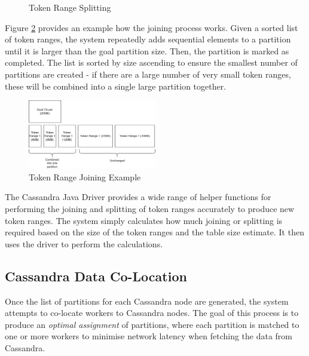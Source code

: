 \begin{figure}[h]
	\centering
	\qquad
	\caption{Token Range Splitting}
	\label{fig:cassandra-split-process}
\end{figure}

Figure \ref{fig:cassandra-join-process} provides an example how the joining process works. Given a sorted list of token ranges, the system repeatedly adds sequential elements to a partition until it is larger than the goal partition size. Then, the partition is marked as completed. The list is sorted by size ascending to ensure the smallest number of partitions are created - if there are a large number of very small token ranges, these will be combined into a single large partition together.

\begin{figure}[h]
	\centering
	\includegraphics[width=0.5\textwidth]{chapters/diagrams/implementation/cassandra-join-example}
	\caption{Token Range Joining Example}
	\label{fig:cassandra-join-process}
\end{figure}

The Cassandra Java Driver provides a wide range of helper functions for performing the joining and splitting of token ranges accurately to produce new token ranges. The system simply calculates how much joining or splitting is required based on the size of the token ranges and the table size estimate. It then uses the driver to perform the calculations.

\subsection{Cassandra Data Co-Location}\label{subsec:colocation}
Once the list of partitions for each Cassandra node are generated, the system attempts to co-locate workers to Cassandra nodes. The goal of this process is to produce an \textit{optimal assignment} of partitions, where each partition is matched to one or more workers to minimise network latency when fetching the data from Cassandra.

